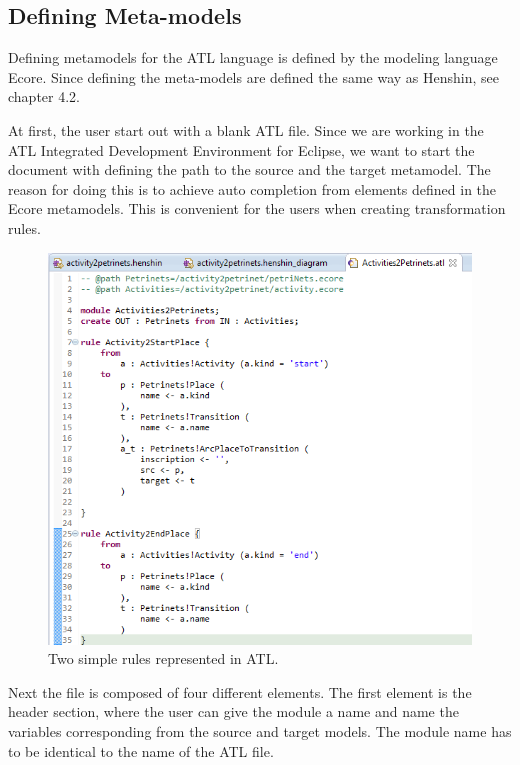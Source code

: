 \subsection{Defining Meta-models}

Defining metamodels for the ATL language is defined by the modeling language
Ecore. Since defining the meta-models are defined the same way as Henshin, see
chapter 4.2.

At first, the user start out with a blank ATL file. Since we are working in
the ATL Integrated Development Environment for Eclipse, we want to start the
document with defining the path to the source and the target metamodel. The
reason for doing this is to achieve auto completion from elements defined in the
Ecore metamodels. This is convenient for the users when creating transformation
rules.  

\begin{figure}[H]
	\centering
	\includegraphics[scale=0.5]{figures/ATLScreen.png}
	\caption[ATL Textual Editor]
	{Two simple rules represented in ATL.}
	\label{fig:ATL_Screen}
\end{figure}

Next the file is composed of four different elements. The first element is the
header section, where the user can give the module a name and name the variables
corresponding from the source and target models. The module name has to be
identical to the name of the ATL file.

